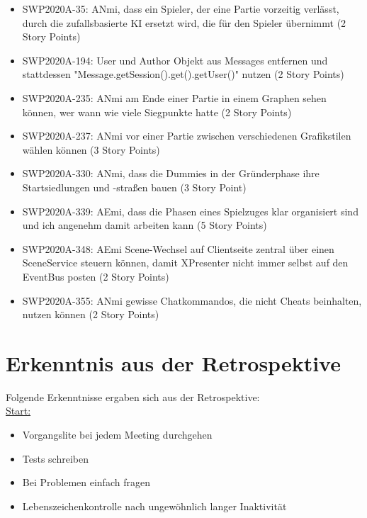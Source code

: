 \documentclass[12pt,a4paper, oneside]{article}
\begin{document}
\begin{itemize}
    \item SWP2020A-35: ANmi, dass ein Spieler, der eine Partie vorzeitig verlässt, durch die zufallsbasierte KI ersetzt wird, die für den Spieler übernimmt (2 Story Points)

    \item SWP2020A-194: User und Author Objekt aus Messages entfernen und stattdessen "Message.getSession().get().getUser()" nutzen (2 Story Points)

    \item SWP2020A-235: ANmi am Ende einer Partie in einem Graphen sehen können, wer wann wie viele Siegpunkte hatte (2 Story Points)

    \item SWP2020A-237: ANmi vor einer Partie zwischen verschiedenen Grafikstilen wählen können (3 Story Points)

    \item SWP2020A-330:	ANmi, dass die Dummies in der Gründerphase ihre Startsiedlungen und -straßen bauen (3 Story Point)

    \item SWP2020A-339: AEmi, dass die Phasen eines Spielzuges klar organisiert sind und ich angenehm damit arbeiten kann (5 Story Points)

    \item SWP2020A-348:	AEmi Scene-Wechsel auf Clientseite zentral über einen SceneService steuern können, damit XPresenter nicht immer selbst auf den EventBus posten (2 Story Points)

    \item SWP2020A-355:	ANmi gewisse Chatkommandos, die nicht Cheats beinhalten, nutzen können (2 Story Points)
\end{itemize}


\section{Erkenntnis aus der Retrospektive}

Folgende Erkenntnisse ergaben sich aus der Retrospektive:
\\

\underline{Start:}

\begin{itemize}
    \item Vorgangslite bei jedem Meeting durchgehen
    \item Tests schreiben
    \item Bei Problemen einfach fragen
    \item Lebenszeichenkontrolle nach ungewöhnlich langer Inaktivität
\end{itemize}
\end{document}

